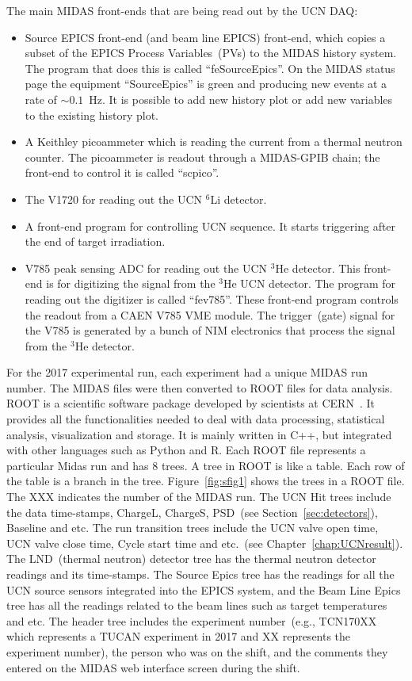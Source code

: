 The main MIDAS front-ends that are being read out by the UCN DAQ:

\begin{itemize}
\item Source EPICS front-end (and beam line EPICS) front-end, which
  copies a subset of the EPICS Process Variables~(PVs) to the MIDAS
  history system.  The program that does this is called
  ``feSourceEpics''. On the MIDAS status page the equipment
  ``SourceEpics'' is green and producing new events at a rate of
  $\sim 0.1$~Hz. It is possible to add new history plot or add new
  variables to the existing history plot.
\item A Keithley picoammeter which is reading the current from a
  thermal neutron counter. The picoammeter is readout through a
  MIDAS-GPIB chain; the front-end to control it is called ``scpico''.
\item The V1720 for reading out the UCN $^6$Li detector.
\item A front-end program for controlling UCN sequence. It starts
  triggering after the end of target irradiation.
\item V785 peak sensing ADC for reading out the UCN $^3$He detector.
  This front-end is for digitizing the signal from the $^3$He UCN
  detector.  The program for reading out the digitizer is called
  ``fev785''.  These front-end program controls the readout from a CAEN
  V785 VME module. The trigger~(gate) signal for the V785 is generated
  by a bunch of NIM electronics that process the signal from the
  $^3$He detector.
\end{itemize}

For the 2017 experimental run, each experiment had a unique MIDAS run
number. The MIDAS files were then converted to ROOT files for data
analysis. ROOT is a scientific software package developed by
scientists at CERN~\cite{brun1997root}. It provides all the
functionalities needed to deal with data processing, statistical
analysis, visualization and storage. It is mainly written in C++, but
integrated with other languages such as Python and R. Each ROOT file
represents a particular Midas run and has 8 trees. A tree in ROOT is
like a table. Each row of the table is a branch in the
tree. Figure~\ref{fig:sfig1} shows the trees in a ROOT file. The XXX
indicates the number of the MIDAS run. The UCN Hit trees include the
data time-stamps, ChargeL, ChargeS, PSD~(see
Section~\ref{sec:detectors}), Baseline and etc. The run transition
trees include the UCN valve open time, UCN valve close time, Cycle
start time and etc.~(see Chapter~\ref{chap:UCNresult}). The
LND~(thermal neutron) detector tree has the thermal neutron detector
readings and its time-stamps. The Source Epics tree has the readings
for all the UCN source sensors integrated into the EPICS system, and
the Beam Line Epics tree has all the readings related to the beam
lines such as target temperatures and etc. The header tree includes
the experiment number~(e.g., TCN170XX which represents a TUCAN
experiment in 2017 and XX represents the experiment number), the
person who was on the shift, and the comments they entered on the
MIDAS web interface screen during the shift.

